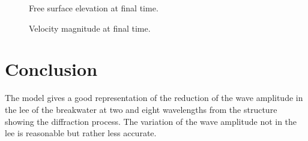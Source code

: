 \begin{figure}[H]
 \centering
 \caption{Free surface elevation at final time.}
 \label{fig:break:FreeSurface}
\end{figure}

\begin{figure}[H]
 \centering
 \caption{Velocity magnitude at final time.}
 \label{fig:break:Velocity}
\end{figure}

\section{Conclusion}

The model gives a good representation of the reduction of the wave amplitude in
the lee of the breakwater at two and eight wavelengths from the structure showing
the diffraction process.
The variation of the wave amplitude not in the lee is reasonable but rather less
accurate.
